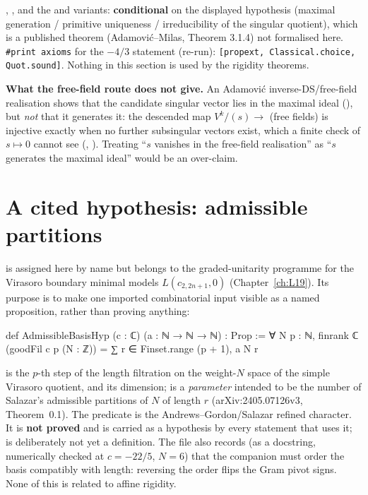 \begin{status}
, ,
and the  and  variants:
\textbf{conditional} on the displayed hypothesis (maximal generation / primitive uniqueness /
irreducibility of the singular quotient), which is a published theorem (Adamovi\'c--Milas, Theorem
3.1.4) not formalised here. \texttt{\#print axioms} for the $-4/3$ statement (re-run):
\texttt{[propext, Classical.choice, Quot.sound]}. Nothing in this section is used by the rigidity
theorems.
\end{status}

\begin{warning}
\textbf{What the free-field route does not give.} An Adamovi\'c inverse-DS/free-field realisation shows
that the candidate singular vector lies in the maximal ideal
(), but \emph{not} that it generates it: the descended
map $V^k/(s)\to$ (free fields) is injective exactly when no further subsingular vectors exist, which a
finite check of $s\mapsto0$ cannot see (,
). Treating ``$s$ vanishes in the free-field realisation'' as
``$s$ generates the maximal ideal'' would be an over-claim.
\end{warning}

\section{A cited hypothesis: admissible partitions}\label{l09:sec:partitions}

 is assigned here by name but belongs to the
graded-unitarity programme for the Virasoro boundary minimal models $L(c_{2,2n+1},0)$
(Chapter~\ref{ch:L19}). Its purpose is to make one imported combinatorial input visible as a named
proposition, rather than proving anything:

\begin{leancode}
def AdmissibleBasisHyp (c : ℂ) (a : ℕ → ℕ → ℕ) : Prop :=
  ∀ N p : ℕ, finrank ℂ (goodFil c p (N : ℤ)) = ∑ r ∈ Finset.range (p + 1), a N r
\end{leancode}

\begin{dictionary}
 is the $p$-th step of the length filtration on the weight-$N$ space of the simple
Virasoro quotient, and  its dimension;  is a \emph{parameter} intended to be
the number of Salazar's admissible partitions of $N$ of length $r$ (arXiv:2405.07126v3, Theorem~0.1).
The predicate is the Andrews--Gordon/Salazar refined character. It is \textbf{not proved} and is carried
as a hypothesis by every statement that uses it;  is deliberately not yet a definition. The
file also records (as a docstring, numerically checked at $c=-22/5$, $N=6$) that the companion
 must order the basis compatibly with length: reversing the order flips the Gram
pivot signs. None of this is related to affine rigidity.
\end{dictionary}

